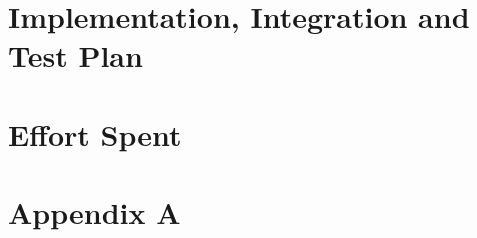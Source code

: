 \documentclass{Configuration_Files/PoliMi3i_project}
\begin{document}
\clearpage
{{\chapter{Implementation, Integration and Test Plan}}}
\label{sect:plan}


\clearpage
\chapter{Effort Spent}
\label{sect:effort}







\appendix
\chapter{Appendix A}


\printglossary[type=\acronymtype]

\listoffigures
\end{document}

